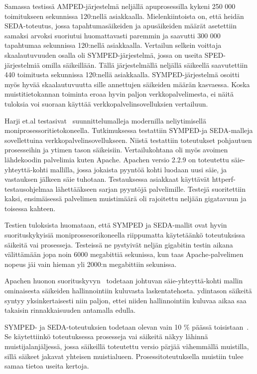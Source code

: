 \documentclass[finnish]{tktltiki2}%
\theoremstyle{definition}
\theoremstyle{remark}
\begin{document}
Samassa testissä AMPED-järjestelmä neljällä apuprosessilla
kykeni 250 000 toimitukseen sekunnissa 120:nellä asiakkaalla. Mielenkiintoista on,
että heidän SEDA-toteutus, jossa tapahtumasäikeiden ja apusäikeiden
määrät asetettiin samaksi arvoksi suoriutui huomattavasti paremmin ja
saavutti 300 000 tapahtumaa sekunnissa 120:nellä asiakkaalla.
Vertailun selkein voittaja skaalautuvuuden
osalla oli SYMPED-järjestelmä, jossa on useita SPED-järjestelmiä
omilla säikeillään. Tällä järjestelmällä neljällä säikeellä
saavutettiin 440 toimitusta sekunnissa 120:nellä asiakkaalla.
SYMPED-järjestelmä osoitti myös hyvää skaalautuvuutta
sille annettujen säikeiden määrän kasvaessa.
Koska muistitietokannan toiminta eroaa
hyvin paljon verkkopalvelimesta, ei näitä
tuloksia voi suoraan käyttää verkkopalvelinsovelluksien 
vertailuun.

Harji et.al testasivat~\cite{harji_comparing_2012} suunnittelumalleja 
modernilla neliytimisellä moniprosessoritietokoneella. Tutkimuksessa
testattiin SYMPED-ja SEDA-malleja sovellettuina verkkopalvelinsovellukseen.
Niistä testattiin toteutukset pohjautuen prosesseihin ja
ytimen tason säikeisiin.
Vertailukohtana oli myös avoimen lähdekoodin palvelimia kuten Apache. Apachen 
versio 2.2.9 on toteutettu säie-yhteyttä-kohti mallilla, jossa
jokaista pyyntöä kohti luodaan uusi säie, ja vastauksen jälkeen säie tuhotaan.
Testauksessa asiakkaat käyttävät httperf-testausohjelmaa lähettääkseen
sarjan pyyntöjä palvelimille.
Testejä suoritettiin kaksi, ensimäisessä palvelimen muistimäärä
oli rajoitettu neljään gigatavuun ja toisessa kahteen.

Testien tuloksista huomataan, että SYMPED ja SEDA-mallit
ovat hyvin suorituskykyisiä moniprossesorikoneella riippumatta käytetäänkö
toteutuksissa säikeitä vai prosesseja. Testeissä ne pystyivät
neljän gigabitin testin aikana välittämään jopa noin 6000 megabittiä sekunissa,
kun taas Apache-palvelimen nopeus jäi vain hieman yli 2000:n megabittiin
sekunissa.

Apachen huonon suorituskyvyn~\cite{harji_comparing_2012} 
todetaan johtuvan säie-yhteyttä-kohti mallin
ominaisesta säikeiden hallinnointiin kuluvasta laskentatehosta.
ydintason säikeitä syntyy yksinkertaisesti niin paljon,
ettei niiden hallinnointiin kuluvaa aikaa saa 
takaisin rinnakkaisuuden antamalla edulla.

SYMPED- ja SEDA-toteutuksien todetaan olevan vain 10 $\%$ päässä
toisistaan~\cite{harji_comparing_2012}. Se käytettiinkö toteutuksessa
prosesseja vai säikeitä
näkyy lähinnä muistijalanjäljessä, jossa säikeillä toteutettu versio
pärjää vähemmällä muistilla, sillä säikeet jakavat
yhteisen muistialueen. Prosessitoteutuksella muistiin tulee
samaa tietoa useita kertoja.
\end{document}
